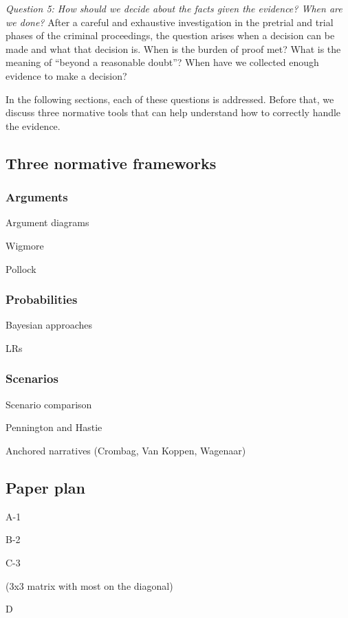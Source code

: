 \documentclass[10pt]{article}
\begin{document}
\textit{Question 5:	How should we decide about the facts given the evidence? When are we done?}
After a careful and exhaustive investigation in the pretrial and trial phases of the criminal proceedings, the question arises when a decision can be made and what that decision is. When is the burden of proof met? What is the meaning of ``beyond a reasonable doubt''? When have we collected enough evidence to make a decision?

In the following sections, each of these questions is addressed. Before that, we discuss three normative tools that can help understand how to correctly handle the evidence.

\subsection{Three normative frameworks}

\subsubsection{Arguments}

			Argument diagrams

			Wigmore

			Pollock

\subsubsection{Probabilities}

			Bayesian approaches

			LRs

\subsubsection{Scenarios}

			Scenario comparison

			Pennington and Hastie

			Anchored narratives (Crombag, Van Koppen, Wagenaar)
			
\subsection{Paper plan}


		A-1

		B-2

		C-3

			(3x3 matrix with most on the diagonal)

		D
\end{document}
